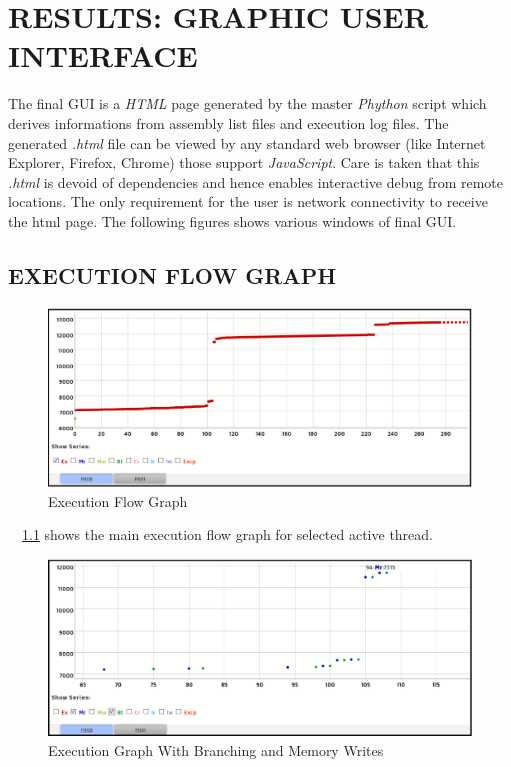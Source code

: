 \chapter{RESULTS: GRAPHIC USER INTERFACE}
\label{chap:GUI_results.tex}
The final GUI is a {\it HTML} page generated by the master {\it Phython} script which derives informations from assembly list files and execution log files. The generated {\it .html} file can be viewed by any standard web browser (like Internet Explorer, Firefox, Chrome) those support {\it JavaScript}. Care is taken that this {\it .html} is devoid of dependencies and hence enables interactive debug from remote locations. The only requirement for the user is network connectivity to receive the html page. The following figures shows various windows of final GUI.
\section {EXECUTION FLOW GRAPH}
\begin{figure}[h]
\centering
\includegraphics[width=6in]{./figures/gui_graph1.eps}
\caption{Execution Flow Graph}
\label{fig:gui_graph1.eps}
\end{figure}

~\figurename {~\ref{fig:gui_graph1.eps}} shows the main execution flow graph for selected active thread.  
\begin{figure}[h]
\centering
\includegraphics[width=6in]{./figures/gui_graph2.eps}
\caption{Execution Graph With Branching and Memory Writes}
\label{fig:gui_graph2.eps}
\end{figure}

